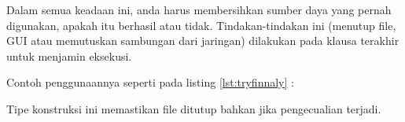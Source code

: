 Dalam semua keadaan ini, anda harus membersihkan sumber daya yang pernah digunakan, apakah itu berhasil atau tidak. Tindakan-tindakan ini (menutup file, GUI atau memutuskan sambungan dari jaringan) dilakukan pada klausa terakhir untuk menjamin eksekusi.

Contoh penggunaannya seperti pada listing \ref{lst:tryfinnaly} :


Tipe konstruksi ini memastikan file ditutup bahkan jika pengecualian terjadi.